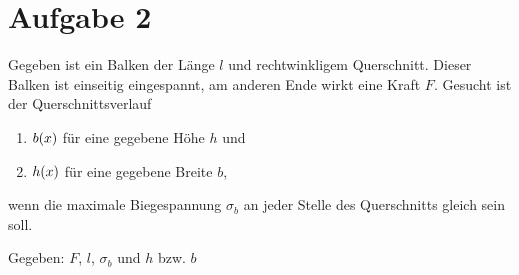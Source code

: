 \documentclass{exercise}
\begin{document}
    
    \section*{Aufgabe 2}
    
    \begin{problem}
        Gegeben ist ein Balken der Länge \(l\) und rechtwinkligem Querschnitt.
        Dieser Balken ist einseitig eingespannt, am anderen Ende wirkt eine Kraft \(F\).
        Gesucht ist der Querschnittsverlauf
        \begin{enumerate}
            \item \(b\parentheses*{x}\) für eine gegebene Höhe \(h\) und
            \item \(h\parentheses*{x}\) für eine gegebene Breite \(b\),
        \end{enumerate}
        wenn die maximale Biegespannung \(\sigma_b\) an jeder Stelle des Querschnitts gleich sein soll.
        
        Gegeben: \(F\), \(l\), \(\sigma_b\) und \(h\) bzw. \(b\)
    \end{problem}
    
\end{document}
